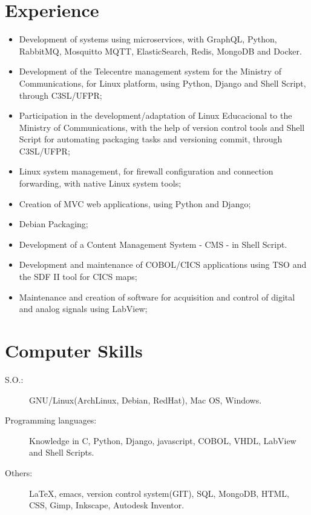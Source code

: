\documentclass[pdftex, a4paper, 11pt]{article}
\begin{document}
\section*{Experience}
\begin{itemize}
  \item Development of systems using microservices, with GraphQL, Python, RabbitMQ, Mosquitto MQTT, ElasticSearch, Redis, MongoDB and Docker.
  \item Development of the Telecentre management system for the Ministry of Communications, for Linux platform, using Python, Django and Shell Script, through C3SL/UFPR;
  \item Participation in the development/adaptation of Linux Educacional to the Ministry of Communications, with the help of version control tools and Shell Script for automating packaging tasks and versioning commit, through C3SL/UFPR;
  \item Linux system management, for firewall configuration and connection forwarding, with native Linux system tools;
  \item Creation of MVC web applications, using Python and Django;
  \item Debian Packaging;
  \item Development of a Content Management System - CMS - in Shell Script.
  \item Development and maintenance of COBOL/CICS applications using TSO and the SDF II tool for CICS maps;
  \item Maintenance and creation of software for acquisition and control of digital and analog signals using LabView;
\end{itemize}

\section*{Computer Skills}
\begin{description}
\item[S.O.:] GNU/Linux(ArchLinux, Debian, RedHat), Mac OS, Windows.
\item[Programming languages:] Knowledge in C, Python, Django, javascript, COBOL, VHDL, LabView and Shell Scripts.
\item[Others:] \LaTeX, emacs, version control system(GIT), SQL, MongoDB, HTML, CSS, Gimp, Inkscape, Autodesk Inventor.
\end{description}
\end{document}
